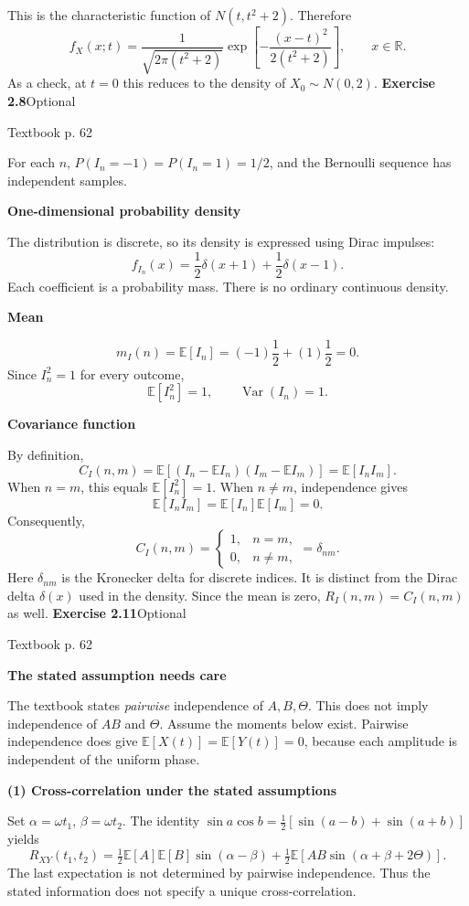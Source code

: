 \documentclass[a4paper,11pt]{article}
\newcommand{\E}{\mathbb E}\newcommand{\Var}{\operatorname{Var}}\newcommand{\Cov}{\operatorname{Cov}}
\newcommand{\problem}[3]{{\LARGE\bfseries Exercise #1}\hfill #2\par{\small\color{gray}Textbook p. #3}\par\vspace{3mm}}
\newcommand{\step}[1]{\par\textbf{#1}\par}
\begin{document}
This is the characteristic function of $N(t,t^2+2)$. Therefore
\[
\boxed{f_X(x;t)=\frac1{\sqrt{2\pi(t^2+2)}}
\exp\left[-\frac{(x-t)^2}{2(t^2+2)}\right],\qquad x\in\mathbb R.}
\]
As a check, at $t=0$ this reduces to the density of $X_0\sim N(0,2)$.
\newpage
\problem{2.8}{Optional}{62}
For each $n$, $P(I_n=-1)=P(I_n=1)=1/2$, and the Bernoulli sequence has independent samples.
\step{One-dimensional probability density}
The distribution is discrete, so its density is expressed using Dirac impulses:
\[
\boxed{f_{I_n}(x)=\frac12\delta(x+1)+\frac12\delta(x-1).}
\]
Each coefficient is a probability mass. There is no ordinary continuous density.
\step{Mean}
\[
\boxed{m_I(n)=\E[I_n]=(-1)\frac12+(1)\frac12=0.}
\]
Since $I_n^2=1$ for every outcome,
\[
\E[I_n^2]=1,\qquad\Var(I_n)=1.
\]
\step{Covariance function}
By definition,
\[
C_I(n,m)=\E[(I_n-\E I_n)(I_m-\E I_m)]=\E[I_nI_m].
\]
When $n=m$, this equals $\E[I_n^2]=1$. When $n\ne m$, independence gives
\[
\E[I_nI_m]=\E[I_n]\E[I_m]=0.
\]
Consequently,
\[
\boxed{C_I(n,m)=\begin{cases}1,&n=m,\\0,&n\ne m,\end{cases}=\delta_{nm}.}
\]
Here $\delta_{nm}$ is the Kronecker delta for discrete indices. It is distinct from the Dirac delta $\delta(x)$ used in the density. Since the mean is zero, $R_I(n,m)=C_I(n,m)$ as well.
\newpage
\problem{2.11}{Optional}{62}
\begingroup\small
\step{The stated assumption needs care}
The textbook states \emph{pairwise} independence of $A,B,\Theta$. This does not imply independence of $AB$ and $\Theta$. Assume the moments below exist. Pairwise independence does give
$\E[X(t)]=\E[Y(t)]=0$, because each amplitude is independent of the uniform phase.
\step{(1) Cross-correlation under the stated assumptions}
Set $\alpha=\omega t_1$, $\beta=\omega t_2$. The identity
$\sin a\cos b=\tfrac12[\sin(a-b)+\sin(a+b)]$ yields
\[
\boxed{R_{XY}(t_1,t_2)=\tfrac12\E[A]\E[B]\sin(\alpha-\beta)
+\tfrac12\E[AB\sin(\alpha+\beta+2\Theta)].}
\]
The last expectation is not determined by pairwise independence. Thus the stated information does not specify a unique cross-correlation.
\end{document}
